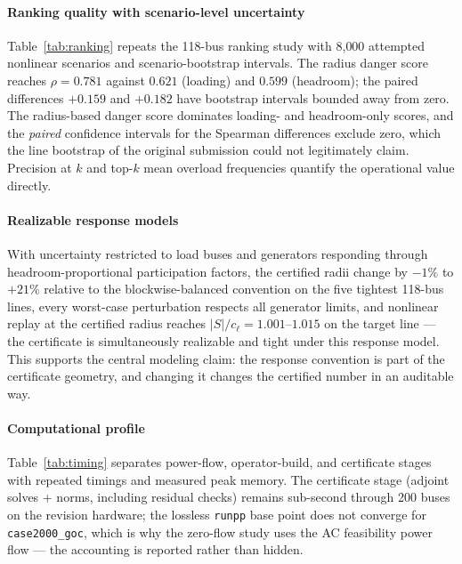 \documentclass[11pt]{article}
\newcommand{\abs}[1]{\left\lvert #1 \right\rvert}
\begin{document}


\paragraph{Ranking quality with scenario-level uncertainty}
Table~\ref{tab:ranking} repeats the 118-bus ranking study with 8{,}000
attempted nonlinear scenarios and scenario-bootstrap intervals.  The
radius danger score reaches $\rho=0.781$ against $0.621$ (loading) and
$0.599$ (headroom); the paired differences $+0.159$ and $+0.182$ have
bootstrap intervals bounded away from zero.  The
radius-based danger score dominates loading- and headroom-only scores, and
the \emph{paired} confidence intervals for the Spearman differences exclude
zero, which the line bootstrap of the original submission could not
legitimately claim.  Precision at $k$ and top-$k$ mean overload frequencies
quantify the operational value directly.



\paragraph{Realizable response models}
With uncertainty restricted to load buses and generators responding through
headroom-proportional participation factors, the certified radii change by
$-1\%$ to $+21\%$ relative to the blockwise-balanced convention on the five
tightest 118-bus lines, every worst-case perturbation respects all generator
limits, and nonlinear replay at the certified radius reaches
$\abs{S}/c_\ell=1.001$--$1.015$ on the target line --- the certificate is
simultaneously realizable and tight under this response model.  This
supports the central modeling claim: the response convention is part of the
certificate geometry, and changing it changes the certified number in an
auditable way.

\paragraph{Computational profile}
Table~\ref{tab:timing} separates power-flow, operator-build, and certificate
stages with repeated timings and measured peak memory.  The certificate
stage (adjoint solves + norms, including residual checks) remains sub-second
through 200 buses on the revision hardware; the lossless \texttt{runpp}
base point does not converge for \texttt{case2000\_goc}, which is why the
zero-flow study uses the AC feasibility power flow --- the accounting is
reported rather than hidden.
\end{document}
